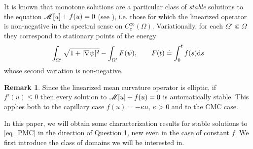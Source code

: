 \documentclass[10 pt,a4paper]{article}
\theoremstyle{definition}
\newtheorem{remark}[definition]{Remark}
\begin{document}
It is known that monotone solutions are a particular class of \emph{stable} solutions to the equation $\mathscr{M}[u] + f(u) = 0$ (see \cite {FSV}), i.e. those for which the linearized operator is non-negative in the spectral sense on $C^\infty_c(\Omega)$. Variationally, for each $\Omega' \Subset \Omega$ they correspond to stationary points of the energy
\[
	\int_{\Omega'} \sqrt{1+|\nabla \psi|^2} - \int_{\Omega'} F(\psi), \qquad F(t) \doteq \int_0^t f(s) \mathrm{d} s 
\]
whose second variation is non-negative. 
 
\begin{remark}
	Since the linearized mean curvature operator is elliptic, if $f'(u) \le 0$ then every solution to $\mathscr{M}[u] + f(u) = 0$ is automatically stable. This applies both to the capillary case $f(u) = -\kappa u$, $\kappa >0$ and to the CMC case. 
\end{remark}

 
In this paper, we will obtain some  characterization results for stable solutions to \eqref{eq_PMC} in the direction of Question 1, new even in the case of constant $f$. We first introduce the class of domains we will be interested in. 
\end{document}
